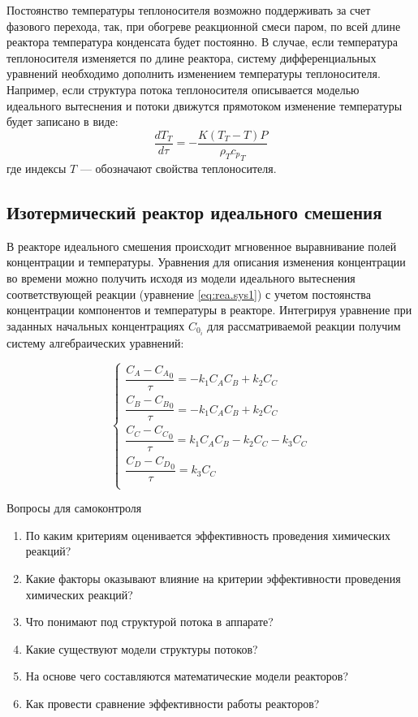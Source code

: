 Постоянство температуры теплоносителя возможно поддерживать за счет фазового перехода, так, при обогреве реакционной смеси паром, по всей длине реактора температура конденсата будет постоянно. В случае, если температура теплоносителя изменяется по длине реактора, систему дифференциальных уравнений необходимо дополнить изменением температуры теплоносителя. Например, если структура потока теплоносителя описывается моделью идеального вытеснения и потоки движутся прямотоком изменение температуры будет записано в виде:
\begin{equation}
	\dfrac{d T_T}{d \tau} = -\dfrac{K(T_T-T)P}{\rho_T {c_p}_T}
\end{equation}
где индексы $T$ --- обозначают свойства теплоносителя.


\subsection*{Изотермический реактор идеального смешения}
В реакторе идеального смешения происходит мгновенное выравнивание полей концентрации и температуры. Уравнения для описания изменения концентрации во времени можно получить исходя из модели идеального вытеснения соответствующей реакции (уравнение \eqref{eq:rea.sys1}) с учетом постоянства концентрации компонентов и температуры в реакторе. Интегрируя уравнение при заданных начальных концентрациях  $C_{0_i}$  для рассматриваемой реакции получим систему алгебраических уравнений:

\begin{equation}\label{eq:rea.syssmis}
\left\lbrace 
\begin{gathered} 
\dfrac{C_A - {C_A}_0} {\tau} = -k_1 C_A C_B +k_2 C_C \\
\dfrac{C_B - {C_B}_0} {\tau} = -k_1 C_A C_B +k_2 C_C \\
\dfrac{C_C - {C_C}_0} {\tau} = k_1 C_A C_B -k_2 C_C - k_3 C_C \\
\dfrac{C_D - {C_D}_0} {\tau} = k_3 C_C \\
\end{gathered} 
\right.
\end{equation}



 
 
Вопросы для самоконтроля
\begin{enumerate}
	\item По каким критериям оценивается эффективность проведения химических реакций?
	\item Какие факторы оказывают влияние на критерии эффективности проведения химических реакций?
	\item Что понимают под структурой потока в аппарате?
	\item Какие существуют модели структуры потоков?
	\item На основе чего составляются математические модели реакторов?
	\item Как провести сравнение эффективности работы реакторов?
\end{enumerate}